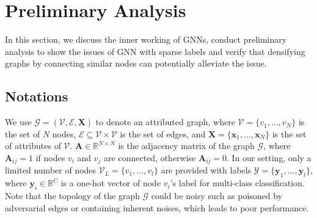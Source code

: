 \section{Preliminary Analysis}
\label{Sec:pre_analysis}
In this section, we discuss the inner working of GNNs, conduct preliminary analysis to show the issues of GNN with sparse labels and verify that densifying graphs by connecting similar nodes can potentially alleviate the issue.

\subsection{Notations}
We use $\mathcal{G}=(\mathcal{V},\mathcal{E}, \mathbf{X})$ to denote an attributed graph, where $\mathcal{V}=\{v_1,...,v_N\}$ is the set of $N$ nodes, $\mathcal{E} \subseteq \mathcal{V} \times \mathcal{V}$ is the set of edges, and $\mathbf{X}=\{\mathbf{x}_1,...,\mathbf{x}_N\}$ is the set of attributes of $\mathcal{V}$. $\mathbf{A} \in \mathbb{R}^{N \times N}$ is the adjacency matrix of the graph $\mathcal{G}$, where $\mathbf{A}_{ij}=1$ if nodes ${v}_i$ and ${v}_j$ are connected, otherwise $\mathbf{A}_{ij}=0$. In 
our setting, only a limited number of nodes $\mathcal{V}_L=\{v_1,...,v_l\}$ are provided with labels $\mathcal{Y}=\{\mathbf{y}_1,...,\mathbf{y}_l\}$, where $\mathbf{y}_i \in \mathbb{R}^C$ is a one-hot vector of node $v_i$'s label for multi-class classification. Note that the topology of the graph $\mathcal{G}$ could be noisy such as poisoned by adversarial edges or containing inherent noises, which leads to poor performance.
\label{sec:3_1}

